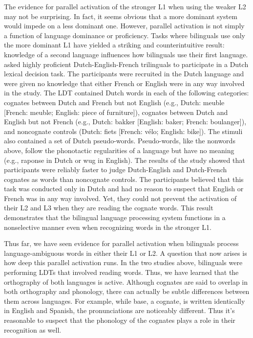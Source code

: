 The evidence for parallel activation of the stronger L1 when using the weaker L2 may not be surprising. In fact, it seems obvious that a more dominant system would impede on a less dominant one. However, parallel activation is not simply a function of language dominance or proficiency. Tasks where bilinguals use only the more dominant L1 have yielded a striking and counterintuitive result: knowledge of a second language influences how bilinguals use their first language. \textcite{VanHell2002} asked highly proficient Dutch-English-French trilinguals to participate in a Dutch lexical decision task. The participants were recruited in the Dutch language and were given no knowledge that either French or English were in any way involved in the study. The LDT contained Dutch words in each of the following categories: cognates between Dutch and French but not English (e.g., Dutch: meuble [French: meuble; English: piece of furniture]), cognates between Dutch and English but not French (e.g., Dutch: bakker [English: baker; French: boulanger]), and noncognate controls (Dutch: fiets [French: vélo; English: bike]). The stimuli also contained a set of Dutch pseudo-words. Pseudo-words, like the nonwords above, follow the phonotactic regularities of a language but have no meaning (e.g., raponse in Dutch or wug in English). The results of the study showed that participants were reliably faster to judge Dutch-English and Dutch-French cognates as words than noncognate controls. The participants believed that this task was conducted only in Dutch and had no reason to suspect that English or French was in any way involved. Yet, they could not prevent the activation of their L2 and L3 when they are reading the cognate words. This result demonstrates that the bilingual language processing system functions in a nonselective manner even when recognizing words in the stronger L1.

Thus far, we have seen evidence for parallel activation when bilinguals process language-ambiguous words in either their L1 or L2. A question that now arises is how deep this parallel activation runs. In the two studies above, bilinguals were performing LDTs that involved reading words. Thus, we have learned that the orthography of both languages is active. Although cognates are said to overlap in both orthography and phonology, there can actually be subtle differences between them across languages. For example, while base, a cognate, is written identically in English and Spanish, the pronunciations are noticeably different. Thus it's reasonable to suspect that the phonology of the cognates plays a role in their recognition as well. 

